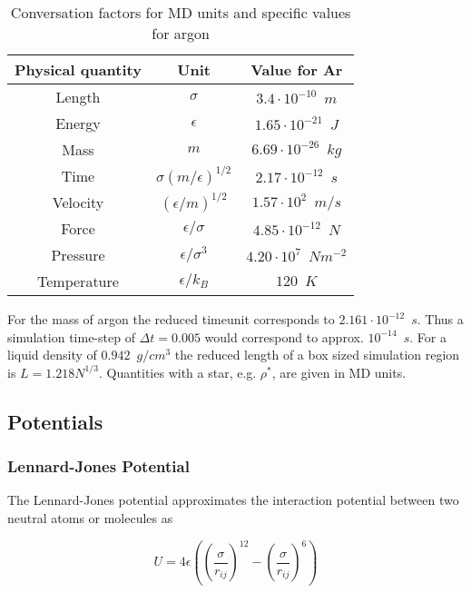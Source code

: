 \documentclass[a4paper]{article}
\begin{document}
\begin{table}[h]
\begin{center}
\begin{tabular}{|c|c|c|}
\hline 
Physical quantity & Unit & Value for Ar \\ 
\hline 
Length & $\sigma$ & $3.4 \cdot 10^{-10} \enspace m$  \\ 
\hline 
Energy & $\epsilon$ & $1.65 \cdot 10^{-21} \enspace J$	 \\ 
\hline 
Mass & $m$ & $6.69 \cdot 10^{-26} \enspace kg$ \\ 
\hline 
Time & $\sigma(m/ \epsilon)^{1/2}$ & $2.17 \cdot 10^{-12} \enspace s$ \\ 
\hline 
Velocity & $(\epsilon/m)^{1/2}$ & $1.57 \cdot 10^2 \enspace m/s$ \\ 
\hline 
Force & $\epsilon/\sigma$ & $4.85 \cdot 10^{-12} \enspace N$ \\ 
\hline 
Pressure & $\epsilon/\sigma^3$ & $4.20 \cdot 10^7 \enspace Nm^{-2}$ \\ 
\hline 
Temperature & $\epsilon/k_B$ & $120 \enspace K$ \\ 
\hline 
\end{tabular} 
\caption{Conversation factors for MD units  and specific values for argon}
\label{tab:conversation_factors}
\end{center}
\end{table}

For the mass of argon the reduced timeunit corresponds to $2.161 \cdot 10^{-12} \enspace s$. Thus a simulation time-step of $\Delta t = 0.005$ would correspond to approx. $10^{-14} \enspace s$. For a liquid density of $0.942 \enspace g/cm^3$ the reduced length of a box sized simulation region is $L = 1.218 N^{1/3}$. Quantities with a star, e.g. $\rho^*$, are given in MD units.

\subsection{Potentials}
\label{subsec:potentials}

\subsubsection{Lennard-Jones Potential}
\label{subsubsec:lennard-jones-potential}

The Lennard-Jones potential approximates the interaction potential between two neutral atoms or molecules as 

\begin{equation}
U = 4 \epsilon \left( \left( \frac{\sigma}{r_{ij}} \right)^{12} - \left( \frac{\sigma}{r_{ij}} \right)^6 \right)
\label{eq:lennard_jones}
\end{equation}
\end{document}
